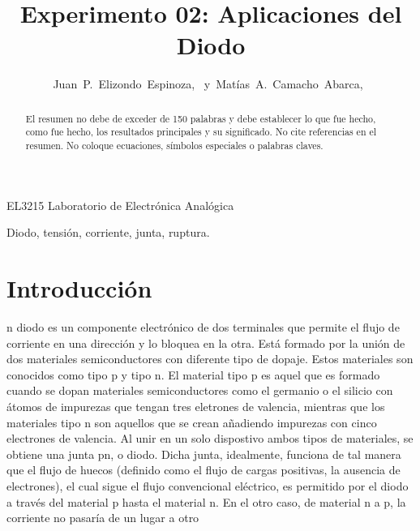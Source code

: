 \documentclass[journal]{IEEEtran}
\begin{document}
%
\title{Experimento 02: Aplicaciones del Diodo}


\author{Juan~P.~Elizondo~Espinoza,~
        y~Matías~A.~Camacho~Abarca,~
}


%
{EL3215 Laboratorio de Electrónica Analógica}


\maketitle


\begin{abstract}
El resumen no debe de exceder de 150 palabras y debe establecer lo que fue hecho, como fue hecho, los resultados principales y su significado. No cite referencias en el resumen. No coloque ecuaciones, símbolos especiales o palabras claves.
\end{abstract}

\begin{IEEEkeywords}
Diodo, tensión, corriente, junta, ruptura.
\end{IEEEkeywords}


\section{Introducción}

n diodo es un componente electrónico de dos terminales que permite el flujo de corriente en una dirección y lo bloquea en la otra. Está formado por la unión de dos materiales semiconductores con diferente tipo de dopaje.
Estos materiales son conocidos como tipo p y tipo n. El material tipo p es aquel que es formado cuando se dopan materiales semiconductores como el germanio
o el silicio con átomos de impurezas que tengan tres eletrones de valencia, mientras que los materiales tipo n son aquellos
que se crean añadiendo impurezas con cinco electrones de valencia. Al unir en un solo dispostivo ambos tipos de materiales, se obtiene
una junta pn, o diodo. Dicha junta, idealmente, funciona de tal manera que el flujo de huecos (definido como el flujo de cargas positivas, la ausencia de electrones), el cual sigue el flujo convencional eléctrico,
es permitido por el diodo a través del material p hasta el material n. En el otro caso, de material n a p, la corriente no pasaría de un lugar a otro
\end{document}
